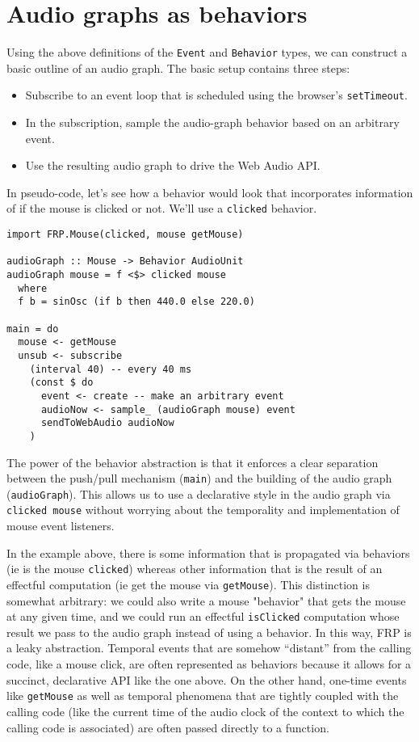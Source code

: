 \documentclass{sig-alternate}
\begin{document}
\begin{sloppypar}
  \section{Audio graphs as behaviors}

  Using the above definitions of the \texttt{Event} and \texttt{Behavior} types, we can construct a basic outline of an audio graph. The basic setup contains three steps:

  \begin{itemize}
    \item Subscribe to an event loop that is scheduled using the browser's \texttt{setTimeout}.
    \item In the subscription, sample the audio-graph behavior based on an arbitrary event.
    \item Use the resulting audio graph to drive the Web Audio API.
  \end{itemize}

  In pseudo-code, let's see how a behavior would look that incorporates information of if the mouse is clicked or not.  We'll use a \texttt{clicked} behavior.

  \begin{verbatim}
import FRP.Mouse(clicked, mouse getMouse)

audioGraph :: Mouse -> Behavior AudioUnit
audioGraph mouse = f <$> clicked mouse
  where
  f b = sinOsc (if b then 440.0 else 220.0)

main = do
  mouse <- getMouse
  unsub <- subscribe
    (interval 40) -- every 40 ms
    (const $ do
      event <- create -- make an arbitrary event
      audioNow <- sample_ (audioGraph mouse) event
      sendToWebAudio audioNow
    )
       \end{verbatim}

  The power of the behavior abstraction is that it enforces a clear separation between the push/pull mechanism (\verb=main=) and the building of the audio graph (\verb=audioGraph=).  This allows us to use a declarative style in the audio graph via \verb=clicked mouse= without worrying about the temporality and implementation of mouse event listeners.

  In the example above, there is some information that is propagated via behaviors (ie is the mouse \texttt{clicked}) whereas other information that is the result of an effectful computation (ie get the mouse via \texttt{getMouse}). This distinction is somewhat arbitrary: we could also write a mouse "behavior" that gets the mouse at any given time, and we could run an effectful \texttt{isClicked} computation whose result we pass to the audio graph instead of using a behavior.  In this way, FRP is a leaky abstraction.  Temporal events that are somehow ``distant'' from the calling code, like a mouse click, are often represented as behaviors because it allows for a succinct, declarative API like the one above. On the other hand, one-time events like \texttt{getMouse} as well as temporal phenomena that are tightly coupled with the calling code (like the current time of the audio clock of the context to which the calling code is associated) are often passed directly to a function.


\end{sloppypar}
\end{document}
